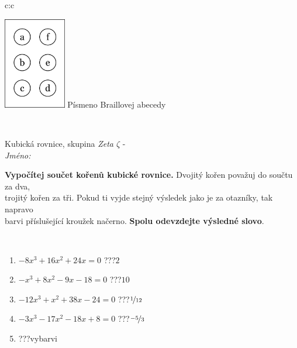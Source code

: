 \documentclass[10pt]{report}
\begin{document}
\begin{tabular}{c:c}
\begin{minipage}[c][104.5mm][t]{0.5\linewidth}
\begin{center}
\begin{minipage}{0.20\linewidth}
\begin{center}
\includegraphics[height=40mm]{../images/braille.png}
{\small Písmeno Braillovej abecedy}
\end{center}
\end{minipage}
\end{center}
\end{minipage}
\\ \hdashline
\begin{minipage}[c][104.5mm][t]{0.5\linewidth}
\begin{center}
\vspace{7mm}
{\huge Kubická rovnice, skupina \textit{Zeta $\zeta$} -}\\[5mm]
\textit{Jméno:}\phantom{xxxxxxxxxxxxxxxxxxxxxxxxxxxxxxxxxxxxxxxxxxxxxxxxxxxxxxxxxxxxxxxxx}\\[5mm]
\begin{minipage}{0.95\linewidth}
\begin{center}
\textbf{Vypočítej součet kořenů kubické rovnice.} Dvojitý kořen považuj do součtu za dva,\\trojitý kořen za tři. Pokud ti vyjde stejný výsledek jako je za otazníky, tak napravo\\barvi příslušející kroužek načerno. \textbf{Spolu odevzdejte výsledné slovo}.
\end{center}
\end{minipage}
\\[1mm]
\begin{minipage}{0.79\linewidth}
\begin{center}
\begin{varwidth}{\linewidth}
\begin{enumerate}
\Large
\item $-8x^3+16x^2+24x=0$\quad \dotfill\; ???\;\dotfill \quad $2$
\item $-x^3+8x^2-9x-18=0$\quad \dotfill\; ???\;\dotfill \quad $10$
\item $-12x^3+x^2+38x-24=0$\quad \dotfill\; ???\;\dotfill \quad $\nicefrac{1}{12}$
\item $-3x^3-17x^2-18x+8=0$\quad \dotfill\; ???\;\dotfill \quad $\nicefrac{-5}{3}$
\item \quad \dotfill\; ???\;\dotfill \quad vybarvi

\end{enumerate}
\end{varwidth}
\end{center}
\end{minipage}
\end{center}
\end{minipage}
\end{tabular}
\end{document}
